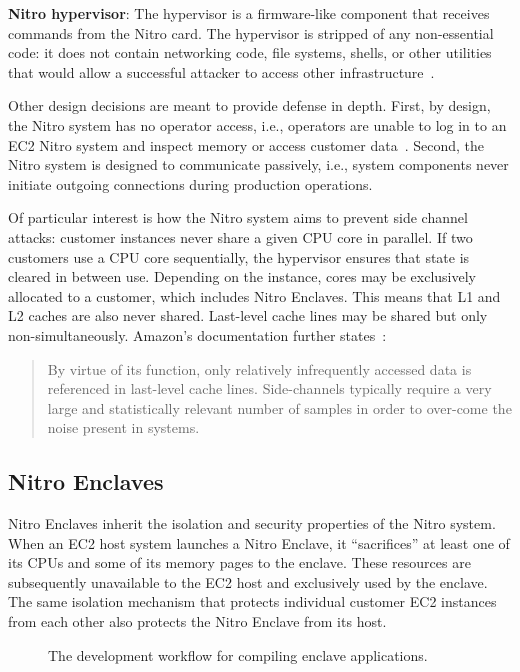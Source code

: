 \textbf{Nitro hypervisor}:
The hypervisor is a firmware-like component that receives commands from the
Nitro card.  The hypervisor is stripped of any non-essential code: it does not
contain networking code, file systems, shells, or other utilities that would
allow a successful attacker to access other
infrastructure~\cite[pp.~11--12]{Bean2022a}.

Other design decisions are meant to provide defense in depth.  First, by
design, the Nitro system has no operator access, i.e., operators are unable to
log in to an EC2 Nitro system and inspect memory or access customer
data~\cite[p.~15]{Bean2022a}. Second, the Nitro system is designed to
communicate passively, i.e., system components never initiate outgoing
connections during production operations.

Of particular interest is how the Nitro system aims to prevent side channel
attacks: customer instances never share a given CPU core in parallel.  If two
customers use a CPU core sequentially, the hypervisor ensures that state is
cleared in between use.  Depending on the instance, cores may be exclusively
allocated to a customer, which includes Nitro Enclaves.  This means that L1 and
L2 caches are also never shared.  Last-level cache lines may be shared but only
non-simultaneously.  Amazon's documentation further
states~\cite[p.~19]{Bean2022a}:

\begin{quote}
By virtue of its function, only relatively infrequently accessed data is
referenced in last-level cache lines.  Side-channels typically require a very
large and statistically relevant number of samples in order to over-come the
noise present in systems.
\end{quote}

\subsection{Nitro Enclaves}%
\label{sec:nitro-enclaves}

Nitro Enclaves inherit the isolation and security properties of the Nitro
system.  When an EC2 host system launches a Nitro Enclave, it ``sacrifices'' at
least one of its CPUs and some of its memory pages to the enclave.  These
resources are subsequently unavailable to the EC2 host and exclusively used by
the enclave.  The same isolation mechanism that protects individual customer EC2
instances from each other also protects the Nitro Enclave from its host.

\begin{figure}[t]
  \centering
  
  \caption{The development workflow for compiling enclave applications.}%
  \label{fig:dev-workflow}
\end{figure}

